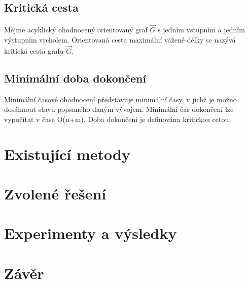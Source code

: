 \documentclass[12pt]{article}
\begin{document}
\subsection{Kritická cesta}
Mějme acyklický ohodnocený orientovaný graf  $\vec{G}$ s jedním vstupním a jedním výstupním vrcholem. Orientovaná cesta maximální vážené délky se nazývá kritická cesta grafu $\vec{G}$. 

\subsection{Minimální doba dokončení}
Minimální časové ohodnocení představuje minimální časy, v jichž je možno dosáhnout stavu popsaného daným vývojem. Minimální čas dokončení lze vypočítat v čase O(n+m). Doba dokončení je definována kritickou cetou. 
\section{Existující metody}
\section{Zvolené řešení}
\section{Experimenty a výsledky}
\section{Závěr}
\nocite{*}


\end{document}
